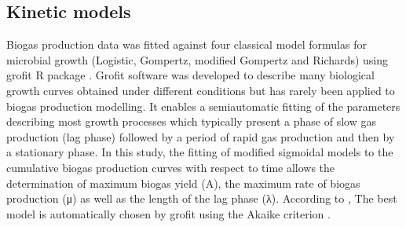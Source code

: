 \subsection{Kinetic models}
Biogas production data was fitted against four classical model formulas for microbial growth (Logistic, Gompertz, modified Gompertz and Richards) using grofit R package \cite{Kahm_2010}. Grofit software was developed to describe many biological growth curves obtained under different conditions but has rarely been applied to biogas production modelling. It enables a semiautomatic fitting of the parameters describing most growth processes which typically present a phase of slow gas production (lag phase) followed by a period of rapid gas production and then by a stationary phase. In this study, the fitting of modified sigmoidal models to the cumulative biogas production curves  with respect to time allows the determination of maximum biogas yield (A), the maximum rate of biogas production (μ) as well as the length of the lag phase (λ). According to \cite{Zwietering1990}, The best model is automatically chosen by grofit using the Akaike criterion \cite{Hasenbrink_2006}.